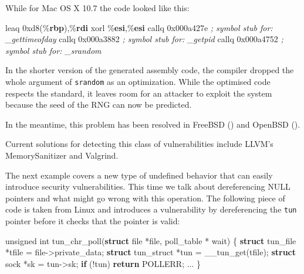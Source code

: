\documentclass[
  a4paper,
]{report}
\newenvironment{Shaded}{}{}
\newcommand{\BaseNTok}[1]{\textcolor[rgb]{0.25,0.63,0.44}{#1}}
\newcommand{\CommentTok}[1]{\textcolor[rgb]{0.38,0.63,0.69}{\textit{#1}}}
\newcommand{\ControlFlowTok}[1]{\textcolor[rgb]{0.00,0.44,0.13}{\textbf{#1}}}
\newcommand{\DataTypeTok}[1]{\textcolor[rgb]{0.56,0.13,0.00}{#1}}
\newcommand{\KeywordTok}[1]{\textcolor[rgb]{0.00,0.44,0.13}{\textbf{#1}}}
\newcommand{\NormalTok}[1]{#1}
\newcommand{\OperatorTok}[1]{\textcolor[rgb]{0.40,0.40,0.40}{#1}}
\begin{document}
While for Mac OS X 10.7 the code looked like this:

\begin{Shaded}
\begin{Highlighting}[]
\NormalTok{leaq    }\BaseNTok{0xd8}\OperatorTok{(\%}\KeywordTok{rbp}\OperatorTok{),\%}\KeywordTok{rdi}
\NormalTok{xorl    }\OperatorTok{\%}\KeywordTok{esi}\OperatorTok{,\%}\KeywordTok{esi}
\NormalTok{callq   }\BaseNTok{0x000a427e}      \CommentTok{; symbol stub for: \_gettimeofday}
\NormalTok{callq   }\BaseNTok{0x000a3882}      \CommentTok{; symbol stub for: \_getpid}
\NormalTok{callq   }\BaseNTok{0x000a4752}      \CommentTok{; symbol stub for: \_srandom}
\end{Highlighting}
\end{Shaded}

In the shorter version of the generated assembly code, the compiler
dropped the whole argument of \texttt{srandom} as an optimization. While
the optimised code respects the standard, it leaves room for an attacker
to exploit the system because the seed of the RNG can now be predicted.

In the meantime, this problem has been resolved in FreeBSD
() and OpenBSD ().

Current solutions for detecting this class of vulnerabilities include
LLVM's MemorySanitizer and Valgrind.

The next example covers a new type of undefined behavior that can easily
introduce security vulnerabilities. This time we talk about
dereferencing NULL pointers and what might go wrong with this operation.
The following piece of code is taken from Linux and introduces a
vulnerability by dereferencing the \texttt{tun} pointer before it checks
that the pointer is valid:

\begin{Shaded}
\begin{Highlighting}[]
\DataTypeTok{unsigned} \DataTypeTok{int}
\NormalTok{tun\_chr\_poll}\OperatorTok{(}\KeywordTok{struct}\NormalTok{ file }\OperatorTok{*}\NormalTok{file}\OperatorTok{,}\NormalTok{ poll\_table }\OperatorTok{*}\NormalTok{ wait}\OperatorTok{)}
\OperatorTok{\{}
  \KeywordTok{struct}\NormalTok{ tun\_file }\OperatorTok{*}\NormalTok{tfile }\OperatorTok{=}\NormalTok{ file}\OperatorTok{{-}\textgreater{}}\NormalTok{private\_data}\OperatorTok{;}
  \KeywordTok{struct}\NormalTok{ tun\_struct }\OperatorTok{*}\NormalTok{tun }\OperatorTok{=}\NormalTok{ \_\_tun\_get}\OperatorTok{(}\NormalTok{tfile}\OperatorTok{);}
  \KeywordTok{struct}\NormalTok{ sock }\OperatorTok{*}\NormalTok{sk }\OperatorTok{=}\NormalTok{ tun}\OperatorTok{{-}\textgreater{}}\NormalTok{sk}\OperatorTok{;}
  \ControlFlowTok{if} \OperatorTok{(!}\NormalTok{tun}\OperatorTok{)}
    \ControlFlowTok{return}\NormalTok{ POLLERR}\OperatorTok{;}
  \OperatorTok{...}
\OperatorTok{\}}
\end{Highlighting}
\end{Shaded}
\end{document}
